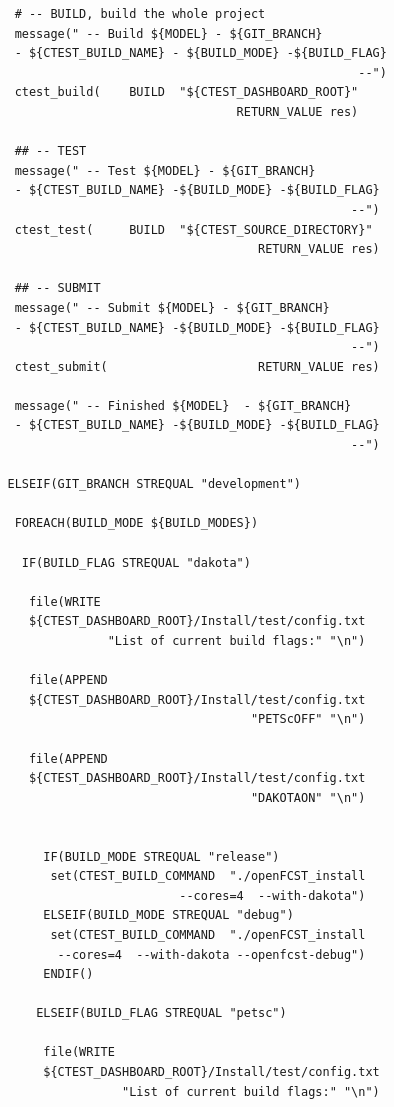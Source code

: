 \begin{lstlisting}
    # -- BUILD, build the whole project
    message(" -- Build ${MODEL} - ${GIT_BRANCH}
    - ${CTEST_BUILD_NAME} - ${BUILD_MODE} -${BUILD_FLAG}
                                                    --")
    ctest_build(    BUILD  "${CTEST_DASHBOARD_ROOT}"
                                   RETURN_VALUE res)

    ## -- TEST
    message(" -- Test ${MODEL} - ${GIT_BRANCH}
    - ${CTEST_BUILD_NAME} -${BUILD_MODE} -${BUILD_FLAG}
                                                   --")
    ctest_test(     BUILD  "${CTEST_SOURCE_DIRECTORY}"
                                      RETURN_VALUE res)

    ## -- SUBMIT
    message(" -- Submit ${MODEL} - ${GIT_BRANCH}
    - ${CTEST_BUILD_NAME} -${BUILD_MODE} -${BUILD_FLAG}
                                                   --")
    ctest_submit(                     RETURN_VALUE res)

    message(" -- Finished ${MODEL}  - ${GIT_BRANCH}
    - ${CTEST_BUILD_NAME} -${BUILD_MODE} -${BUILD_FLAG}
                                                   --")

   ELSEIF(GIT_BRANCH STREQUAL "development")

    FOREACH(BUILD_MODE ${BUILD_MODES})

     IF(BUILD_FLAG STREQUAL "dakota")

      file(WRITE
      ${CTEST_DASHBOARD_ROOT}/Install/test/config.txt
                 "List of current build flags:" "\n")
                 
      file(APPEND
      ${CTEST_DASHBOARD_ROOT}/Install/test/config.txt
                                     "PETScOFF" "\n")   
                                        
      file(APPEND
      ${CTEST_DASHBOARD_ROOT}/Install/test/config.txt
                                     "DAKOTAON" "\n")
                                     

        IF(BUILD_MODE STREQUAL "release")
         set(CTEST_BUILD_COMMAND  "./openFCST_install
                           --cores=4  --with-dakota")
        ELSEIF(BUILD_MODE STREQUAL "debug")
         set(CTEST_BUILD_COMMAND  "./openFCST_install
          --cores=4  --with-dakota --openfcst-debug")
        ENDIF()

       ELSEIF(BUILD_FLAG STREQUAL "petsc")

        file(WRITE
        ${CTEST_DASHBOARD_ROOT}/Install/test/config.txt
                   "List of current build flags:" "\n")
                   

\end{lstlisting}
